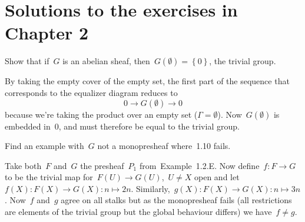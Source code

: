 \documentclass[a4paper,11pt,oneside,openany,article]{memoir}
\begin{document}
\clearpage

\chapter{Solutions to the exercises in Chapter 2}
\begin{exercise}[1.9]
  Show that if~$G$ is an abelian sheaf, then~$G(\emptyset)=\left\{ 0 \right\}$, the trivial group.

  \begin{solution}
    By taking the empty cover of the empty set, the first part of the sequence that corresponds to the equalizer diagram reduces to
    \begin{equation}
      0\to G(\emptyset)\to 0
    \end{equation}
    because we're taking the product over an empty set ($\Gamma=\emptyset$). Now~$G(\emptyset)$ is embedded in~$0$, and must therefore be equal to the trivial group.
  \end{solution}
\end{exercise}

\begin{exercise}[1.12]
  Find an example with~$G$ not a monopresheaf where~1.10 fails.

  \begin{solution}
    Take both~$F$ and~$G$ the presheaf~$P_1$ from~Example~1.2.E. Now define~$f\colon F\to G$ to be the trivial map for~$F(U)\to G(U)$,~$U\neq X$ open and let~$f(X)\colon F(X)\to G(X):n\mapsto 2n$. Similarly,~$g(X)\colon F(X)\to G(X):n\mapsto 3n$. Now~$f$ and~$g$ agree on all stalks but as the monopresheaf fails (all restrictions are elements of the trivial group but the global behaviour differs) we have~$f\neq g$.
  \end{solution}
\end{exercise}
\end{document}
